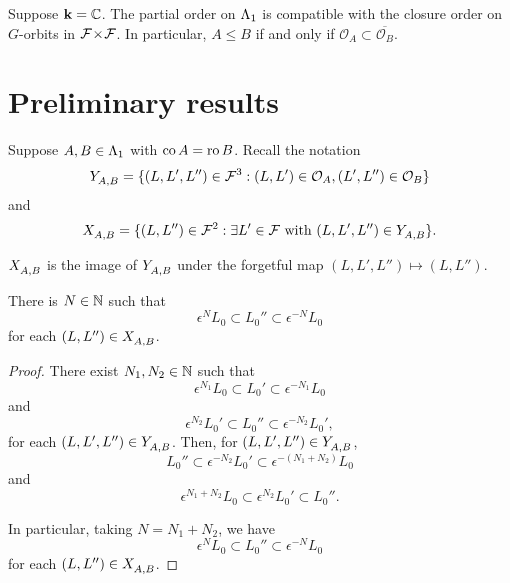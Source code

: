 \documentclass[a4paper, 11pt]{report}
\begin{document}
\begin{conjecture}
Suppose $\mathbf{k}=\mathbb{C}$. The partial order on ${\Lambda_1}$ is compatible with the closure order on $G$-orbits in ${\mathcal{F}\!\times\!\mathcal{F}}$. In particular, $A\le B$ if and only if $\mathcal{O}_A\subset \overline{\mathcal{O}_B}$.
\end{conjecture}

\section{Preliminary results}

Suppose $A,B\in{\Lambda_1}$ with $\operatorname{co}{A}=\operatorname{ro}{B}$. Recall the notation
\begin{equation*}
Y_{A,B}^{} = \{(L,L',L'')\in\mathcal{F}^3: (L,L')\in\mathcal{O}_A, (L',L'')\in\mathcal{O}_B\}
\end{equation*}
and
\begin{equation*}
X_{A,B}^{} = \{(L,L'')\in\mathcal{F}^2:\exists L'\in\mathcal{F} \text{ with } (L,L',L'')\in Y_{A,B}^{}\}.
\end{equation*}

$X_{A,B}^{}$ is the image of $Y_{A,B}^{}$ under the forgetful map $(L,L',L'')\mapsto (L,L'')$.

\begin{lemma}\label{lemma:orbit-products-are-bounded}
There is $N\in\mathbb{N}$ such that
\begin{equation*}
\epsilon^N L_0\subset L_0''\subset \epsilon^{-N}L_0
\end{equation*}
for each $(L,L'')\in X_{A,B}^{}$.
\end{lemma}

\begin{proof}
There exist $N_1,N_2\in\mathbb{N}$ such that
\begin{equation*}
\epsilon^{N_1}L_0\subset L_0'\subset \epsilon^{-N_1}L_0
\end{equation*}
and
\begin{equation*}
\epsilon^{N_2}L_0'\subset L_0''\subset \epsilon^{-N_2}L_0',
\end{equation*}
for each $(L,L',L'')\in Y_{A,B}^{}$. Then, for $(L,L',L'')\in Y_{A,B}^{}$,
\begin{equation*}
L_0''\subset \epsilon^{-N_2} L_0' \subset \epsilon^{-(N_1+N_2)} L_0
\end{equation*}
and
\begin{equation*}
\epsilon^{N_1+N_2}L_0\subset \epsilon^{N_2}L_0'\subset L_0''.
\end{equation*}

In particular, taking $N=N_1 + N_2$, we have
\begin{equation*}
\epsilon^N L_0 \subset L_0'' \subset \epsilon^{-N}L_0
\end{equation*}
for each $(L,L'')\in X_{A,B}^{}$.
\end{proof}
\end{document}
